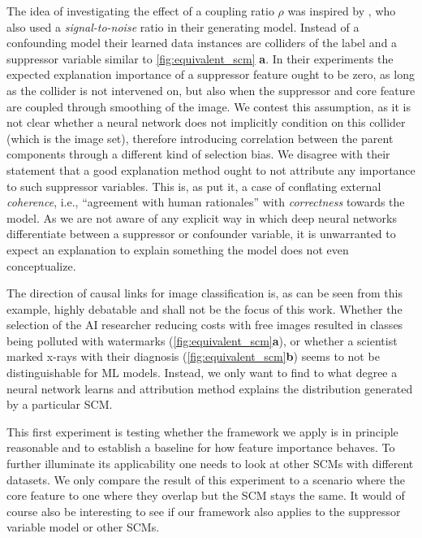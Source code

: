 The idea of investigating the effect of a coupling ratio $\rho$ was inspired by \citet{Clark2023}, who also used a \textit{signal-to-noise} ratio in their generating model. Instead of a confounding model their learned data instances are colliders of the label and a suppressor variable similar to \cref{fig:equivalent_scm} \textbf{a}. In their experiments the expected explanation importance of a suppressor feature ought to be zero, as long as the collider is not intervened on, but also when the suppressor and core feature are coupled through smoothing of the image. We contest this assumption, as it is not clear whether a neural network does not implicitly condition on this collider (which is the image set), therefore introducing correlation between the parent components through a different kind of selection bias. We disagree with their statement that a good explanation method ought to not attribute any importance to such suppressor variables. This is, as  \citet{Nauta2023} put it, a case of conflating external \textit{coherence}, i.e., ``agreement with human rationales'' \citep{Atanasova2020} with \textit{correctness} towards the model. As we are not aware of any explicit way in which deep neural networks differentiate between a suppressor or confounder variable, it is unwarranted to expect an explanation to explain something the model does not even conceptualize. 

The direction of causal links for image classification is, as can be seen from this example, highly debatable and shall not be the focus of this work. Whether the selection of the AI researcher reducing costs with free images resulted in classes being polluted with watermarks (\cref{fig:equivalent_scm}\textbf{a}), or whether a scientist marked x-rays with their diagnosis (\cref{fig:equivalent_scm}\textbf{b}) seems to not be distinguishable for ML models. 
Instead, we only want to find to what degree a neural network learns and attribution method explains the distribution generated by a particular SCM.

This first experiment is testing whether the framework we apply is in principle reasonable and to establish a baseline for how feature importance behaves. To further illuminate its applicability one needs to look at other SCMs with different datasets. We only compare the result of this experiment to a scenario where the core feature to one where they overlap but the SCM stays the same. 
It would of course also be interesting to see if our framework also applies to the suppressor variable model or other SCMs.

